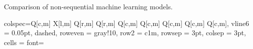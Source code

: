 \begin{table}[h!]
    \centering
    \caption{Comparison of non-sequential machine learning models.}

   \begin{tblr}[
    ]{
      colspec={Q[c,m]
               X[l,m]
               Q[r,m]
               Q[r,m]
               Q[c,m]
               Q[c,m]
               Q[c,m]
               Q[c,m]
               Q[c,m]},
      vline{6} = {0.05pt, dashed},
      row{even} = {gray!10},
      row{2} = {c1m},
      rowsep = 3pt,
      colsep = 3pt,
      cells = {font=\fontsize{7}{8}\linespread{1.00}\selectfont} %
    }
    

\end{tblr}
\end{table}
